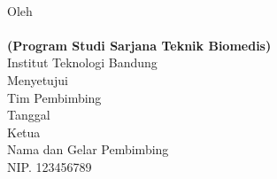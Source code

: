 \clearpage
\pagestyle{empty}

\begin{center}

    \large{\bfseries \MakeUppercase{\thetitle}}
    \\[2\baselineskip]
	
	\renewcommand{\baselinestretch}{1}
    \normalsize{Oleh\\
    \textbf{\theauthor}\\
    \textbf{(Program Studi Sarjana Teknik Biomedis)}
    \\[\baselineskip]
    Institut Teknologi Bandung}
    \\[3\baselineskip]

    \normalsize{Menyetujui\\
    Tim Pembimbing
    \\[\baselineskip]
    
    Tanggal \thedate\\[3\baselineskip]
    Ketua\\[4\baselineskip]
    Nama dan Gelar Pembimbing\\
    NIP. 123456789}

\end{center}
\clearpage
